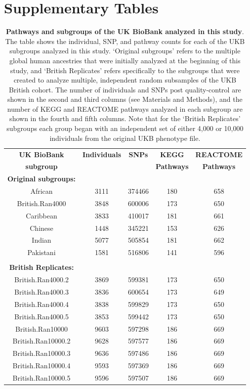 \documentclass[10pt,a4paper]{article}
\begin{document}
\section{Supplementary Tables}\label{Supplementary-Tables}

\begin{table}[ht]
\centering
\begin{tabular}{ccccc}
  \hline
\textbf{UK BioBank} & \textbf{Individuals} & \textbf{SNPs} & \textbf{KEGG} & \textbf{REACTOME} \\
\textbf{subgroup} & & & \textbf{Pathways} & \textbf{Pathways}  \\
  \hline
\textbf{Original subgroups:} & & & & \\
African & 3111 & 374466 & 180 & 658 \\ 
British.Ran4000 & 3848 & 600006 & 173 & 650 \\ 
Caribbean & 3833 & 410017 & 181 & 661 \\ 
Chinese & 1448 & 345221 & 153 & 626 \\ 
Indian & 5077 & 505854 & 181 & 662 \\ 
Pakistani & 1581 & 516806 & 141 & 596 \\ 
\\
\textbf{British Replicates:} & & & & \\
British.Ran4000.2 & 3869 & 599381 & 173 & 650 \\ 
British.Ran4000.3 & 3836 & 600654 & 173 & 649 \\ 
British.Ran4000.4 & 3838 & 599829 & 173 & 650 \\ 
British.Ran4000.5 & 3853 & 599442 & 173 & 650 \\ 
British.Ran10000 & 9603 & 597298 & 186 & 669 \\ 
British.Ran10000.2 & 9628 & 597577 & 186 & 669 \\ 
British.Ran10000.3 & 9636 & 597486 & 186 & 669 \\ 
British.Ran10000.4 & 9593 & 597369 & 186 & 669 \\ 
British.Ran10000.5 & 9596 & 597507 & 186 & 669 \\ 
  \hline
\end{tabular}
\caption[TBD]{\textbf{Pathways and subgroups of the UK BioBank analyzed in this study}. The table shows the individual, SNP, and pathway counts for each of the UKB subgroups analyzed in this study. `Original subgroups' refers to the multiple global human ancestries that were initially analyzed at the beginning of this study, and `British Replicates' refers specifically to the subgroups that were created to analyze multiple, independent random subsamples of the UKB British cohort. The number of individuals and SNPs post quality-control are shown in the second and third columns (see Materials and Methods), and the number of KEGG and REACTOME pathways analyzed in each subgroup are shown in the fourth and fifth columns. Note that for the `British Replicates' subgroups each group began with an independent set of either 4,000 or 10,000 individuals from the original UKB phenotype file.}
\label{InterPath-Supp-Table-UKBPopStats}
\end{table}
\clearpage
\end{document}
